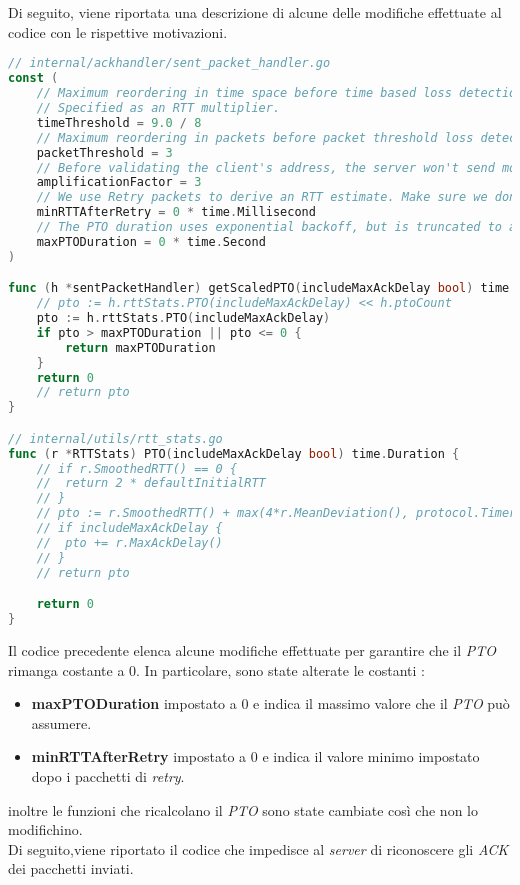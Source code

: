 \\\\
Di seguito, viene riportata una descrizione di alcune delle modifiche effettuate al codice con le rispettive motivazioni.
\begin{lstlisting}[language=Go]
// internal/ackhandler/sent_packet_handler.go
const (
	// Maximum reordering in time space before time based loss detection considers a packet lost.
	// Specified as an RTT multiplier.
	timeThreshold = 9.0 / 8
	// Maximum reordering in packets before packet threshold loss detection considers a packet lost.
	packetThreshold = 3
	// Before validating the client's address, the server won't send more than 3x bytes than it received.
	amplificationFactor = 3
	// We use Retry packets to derive an RTT estimate. Make sure we don't set the RTT to a super low value yet.
	minRTTAfterRetry = 0 * time.Millisecond 
	// The PTO duration uses exponential backoff, but is truncated to a maximum value, as allowed by RFC 8961, section 4.4.
	maxPTODuration = 0 * time.Second 
)

func (h *sentPacketHandler) getScaledPTO(includeMaxAckDelay bool) time.Duration {
	// pto := h.rttStats.PTO(includeMaxAckDelay) << h.ptoCount
	pto := h.rttStats.PTO(includeMaxAckDelay)
	if pto > maxPTODuration || pto <= 0 {
		return maxPTODuration
	}
	return 0
	// return pto
}

// internal/utils/rtt_stats.go
func (r *RTTStats) PTO(includeMaxAckDelay bool) time.Duration {
	// if r.SmoothedRTT() == 0 {
	// 	return 2 * defaultInitialRTT
	// }
	// pto := r.SmoothedRTT() + max(4*r.MeanDeviation(), protocol.TimerGranularity)
	// if includeMaxAckDelay {
	// 	pto += r.MaxAckDelay()
	// }
	// return pto

	return 0
}
\end{lstlisting}
\noindent Il codice precedente elenca alcune modifiche effettuate per garantire che il \emph{PTO} rimanga costante a 0. 
In particolare, sono state alterate le costanti : 
\begin{itemize}
    \item \textbf{maxPTODuration} impostato a 0 e indica il massimo valore che il \emph{PTO} può assumere. 
    \item \textbf{minRTTAfterRetry} impostato a 0 e indica il valore minimo impostato dopo i pacchetti di \emph{retry}.
\end{itemize}
\noindent inoltre le funzioni che ricalcolano il \emph{PTO} sono state cambiate così che non lo modifichino.
\\
Di seguito,viene riportato il codice che impedisce al \emph{server} di riconoscere gli \emph{ACK} dei pacchetti inviati. 
